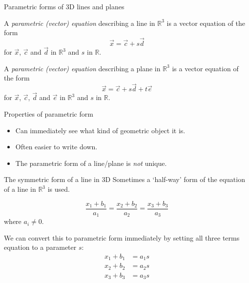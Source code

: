 \documentclass{beamer}
\begin{document}
\begin{frame}{Parametric forms of 3D lines and planes}
  \begin{definition}
    A \emph{parametric (vector) equation} describing a line in $\mathbb R^3$ is a vector equation of the form
    \begin{equation*}
      \vec{x} = \vec{c}+s\vec{d}
    \end{equation*}
    for $\vec{x}$, $\vec{c}$ and $\vec{d}$ in $\mathbb R^3$ and $s$ in $\mathbb R$.
  \end{definition}\vfill
  \begin{definition}
    A \emph{parametric (vector) equation} describing a plane in $\mathbb R^3$ is a vector equation of the form
    \begin{equation*}
      \vec{x} = \vec{c}+s\vec{d}+t\vec{e}
    \end{equation*}
    for $\vec{x}$, $\vec{c}$, $\vec{d}$ and $\vec{e}$ in $\mathbb R^3$ and $s$ in $\mathbb R$.
  \end{definition}
\end{frame}

\begin{frame}{Properties of parametric form}
  \begin{itemize}
  \item Can immediately see what kind of geometric object it is.\vfill
  \item Often easier to write down.\vfill
  \item The parametric form of a line/plane is \emph{not} unique.
  \end{itemize}
\end{frame}

\begin{frame}{The symmetric form of a line in 3D}
  Sometimes a `half-way' form of the equation of a line in $\mathbb R^3$ is used.\vfill
  \begin{definition}
    \begin{equation*}
      \frac{x_1+b_1}{a_1} = \frac{x_2+b_2}{a_2} =\frac{x_3+b_3}{a_3}
    \end{equation*}
    where $a_i\neq 0$.
  \end{definition}\vfill
  We can convert this to parametric form immediately by setting all three terms equation to a parameter $s$:
  \begin{align*}
    x_1+b_1&= a_1s\\
    x_2+b_2&= a_2s\\
    x_3+b_3&= a_3s
  \end{align*}
\end{frame}
\end{document}
